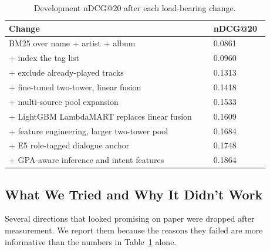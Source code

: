 \documentclass[sigconf]{acmart}
\begin{document}
\begin{table}
  \caption{Development nDCG@20 after each load-bearing change.}
  \label{tab:results}
  \begin{tabular}{p{0.72\linewidth}p{0.16\linewidth}}
    \toprule
    \textbf{Change} & \textbf{nDCG@20} \\
    \midrule
    BM25 over name + artist + album & 0.0861 \\
    + index the tag list & 0.0960 \\
    + exclude already-played tracks & 0.1313 \\
    + fine-tuned two-tower, linear fusion & 0.1418 \\
    + multi-source pool expansion & 0.1533 \\
    + LightGBM LambdaMART replaces linear fusion & 0.1609 \\
    + feature engineering, larger two-tower pool & 0.1684 \\
    + E5 role-tagged dialogue anchor & 0.1748 \\
    + GPA-aware inference and intent features & 0.1864 \\
    \bottomrule
  \end{tabular}
\end{table}

\subsection{What We Tried and Why It Didn't Work}

Several directions that looked promising on paper were dropped after
measurement. We report them because the reasons they failed are more
informative than the numbers in Table~\ref{tab:results} alone.
\end{document}
